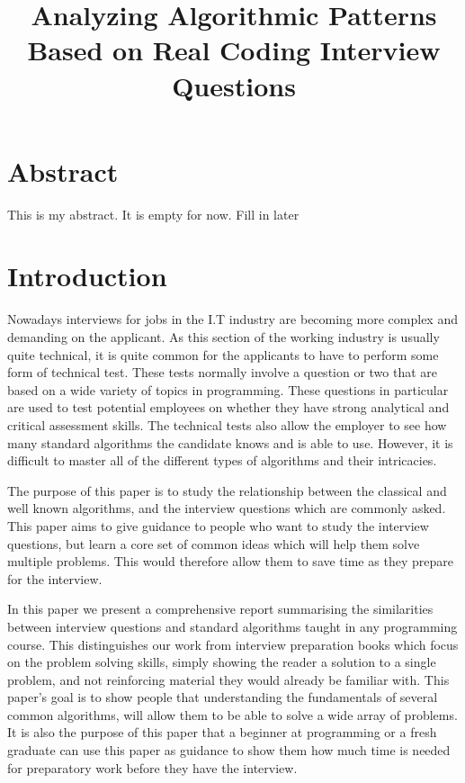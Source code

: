 \documentclass[10pt,twocolumn]{IEEEtran}
\title{Analyzing Algorithmic Patterns Based on Real Coding Interview Questions}
\author{\IEEEauthorblockN{Ian Dempsey,\\
Computer Science Department,\\
Maynooth University,\\
Email: ian.dempsey.2013@mumail.ie}
}
\begin{document}
\maketitle
{}
\newpage
{}
\section{Abstract}
This is my abstract. It is empty for now. Fill in later
\section{Introduction}
\label{sec:intro}
\par
Nowadays interviews for jobs in the I.T industry are becoming more complex and demanding on the applicant. As this section of the working industry is usually quite technical, it is quite common for the applicants to have to perform some form of technical test. These tests normally involve a question or two that are based on a wide variety of topics in programming. These questions in particular are used to test potential employees on whether they have strong analytical and critical assessment skills. The technical tests also allow the employer to see how many standard algorithms the candidate knows and is able to use. However, it is difficult to master all of the different types of algorithms and their intricacies. 
\par The purpose of this paper is to study the relationship between the classical and well known algorithms, and the interview questions which are commonly asked.  This paper aims to give guidance to people who want to study the interview questions, but learn a core set of common ideas which will help them solve multiple problems. This would therefore allow them to save time as they prepare for the interview.
\par In this paper we present a comprehensive report summarising the similarities between interview questions and standard algorithms taught in any programming course. This distinguishes our work from interview preparation books which focus on the problem solving skills, simply showing the reader a solution to a single problem, and not reinforcing material they would already be familiar with. This paper's goal is to show people that understanding the fundamentals of several common algorithms, will allow them to be able to solve a wide array of problems. It is also the purpose of this paper that a beginner at programming or a fresh graduate can use this paper as guidance to show them how much time is needed for preparatory work before they have the interview.  
\end{document}

